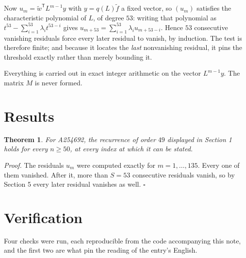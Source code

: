 \documentclass[11pt]{article}
\newtheorem{theorem}{Theorem}
\theoremstyle{definition}
\begin{document}
Now $u_m = \tilde w^{\mathsf T} L^{m-1} y$ with $y = q(L)\tilde f$ a fixed vector, so $(u_m)$ satisfies the characteristic polynomial of $L$, of degree $53$: writing that polynomial as $t^{53} - \sum_{i=1}^{53} \lambda_i t^{53-i}$ gives $u_{m+53} = \sum_{i=1}^{53} \lambda_i u_{m+53-i}$. Hence $53$ consecutive vanishing residuals force every later residual to vanish, by induction. The test is therefore finite; and because it locates the {\itshape last} nonvanishing residual, it pins the threshold exactly rather than merely bounding it.

Everything is carried out in exact integer arithmetic on the vector $L^{m-1}y$. The matrix $M$ is never formed.

\section{Results}

\begin{theorem} For A254692, the recurrence of order $49$ displayed in Section 1 holds for every $n \ge 50$, at every index at which it can be stated.\end{theorem}

{\itshape Proof.} The residuals $u_m$ were computed exactly for $m = 1,\dots,135$. Every one of them vanished. After it, more than $S = 53$ consecutive residuals vanish, so by Section 5 every later residual vanishes as well. $\square$

\section{Verification}

Four checks were run, each reproducible from the code accompanying this note, and the first two are what pin the reading of the entry's English.
\end{document}
